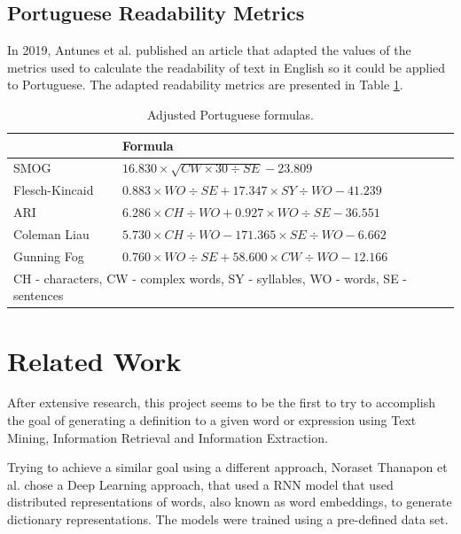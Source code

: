 \subsection{Portuguese Readability Metrics}

In 2019, Antunes et al.\cite{antunes2019analyzing} published an article that adapted the values of the metrics used to calculate the readability of text in English so it could be applied to Portuguese.
The adapted readability metrics are presented in Table \ref{table:ptformulas}.

\begin{table}
    \caption{Adjusted Portuguese formulas.}
    \label{table:ptformulas}
    \begin{tabular}{l|l}
        \hline
        {} & {\bfseries Formula} \\
        \hline
        SMOG & \(16.830 \times \sqrt{CW \times 30 \div SE} - 23.809\)  \\
        \hline
        Flesch-Kincaid & \(0.883 \times WO \div SE + 17.347 \times SY \div WO - 41.239\) \\
        \hline
        ARI & \(6.286 \times CH \div WO + 0.927 \times WO \div SE - 36.551\) \\
        \hline
        Coleman Liau & \(5.730 \times CH \div WO - 171.365 \times SE \div WO - 6.662\) \\
        \hline
        Gunning Fog & \(0.760 \times WO \div SE + 58.600 \times CW \div WO - 12.166\) \\
        \hline
        \multicolumn{2}{l}{CH - characters, CW - complex words, SY - syllables, WO - words, SE - sentences}
    \end{tabular}
\end{table}

\section{Related Work}

After extensive research, this project seems to be the first to try to accomplish the goal of generating a definition to a given word or expression using Text Mining, Information Retrieval and Information Extraction.

Trying to achieve a similar goal using a different approach, Noraset Thanapon et al.\cite{noraset2016definition} chose a Deep Learning approach, that used a \gls{RNN} model that used distributed representations of words, also known as word embeddings, to generate dictionary representations.
The models were trained using a pre-defined data set.

